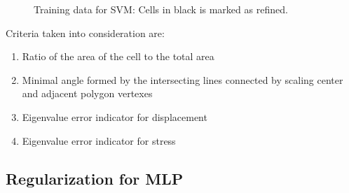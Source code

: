 \begin{figure}[!ht]
\begin{subfigure}[b]{0.49\linewidth}
{        }
    \end{subfigure}
    \begin{subfigure}[b]{0.49\linewidth}
    \end{subfigure}
    \caption[Training data for SVM]{Training data for SVM: Cells in black is marked as refined.}
    \label{adap_fig:svm_train_my}
\end{figure}

Criteria taken into consideration are: 
\begin{enumerate}
    \item Ratio of the area of the cell to the total area
    \item Minimal angle formed by the intersecting lines connected by scaling center and adjacent polygon vertexes
    \item Eigenvalue error indicator for displacement
    \item Eigenvalue error indicator for stress
\end{enumerate}

\subsection{Regularization for MLP}
